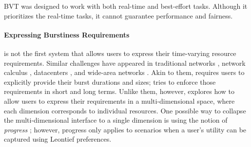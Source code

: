 BVT \cite{bvt} was designed to work with both real-time and best-effort tasks. Although it prioritizes the real-time tasks, it cannot guarantee performance and fairness.

\paragraph{Expressing Burstiness Requirements}
{\name} is not the first system that allows users to express their time-varying resource requirements. 
Similar challenges have appeared in traditional networks \cite{hfsc}, network calculus \cite{cruz1, cruz2}, datacenters \cite{silo, pulsar}, and wide-area networks \cite{bwe}.
Akin to them, {\name} requires users to explicitly provide their burst durations and sizes; {\name} tries to enforce those requirements in short and long terms. 
Unlike them, however, {\name} explores how to allow users to express their requirements in a multi-dimensional space, where each dimension corresponds to individual resources. 
One possible way to collapse the multi-dimensional interface to a single dimension is using the notion of \emph{progress} \cite{hug, drf}; however, progress only applies to scenarios when a user's utility can be captured using Leontief preferences. 
